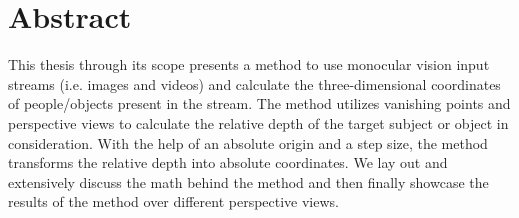 \chapter*{Abstract}
This thesis through its scope presents a method to use monocular vision input streams (i.e. images and videos) and calculate the three-dimensional coordinates of people/objects present in the stream. The method utilizes vanishing points and perspective views to calculate the relative depth of the target subject or object in consideration. With the help of an absolute origin and a step size, the method transforms the relative depth into absolute coordinates. We lay out and extensively discuss the math behind the method and then finally showcase the results of the method over different perspective views.
